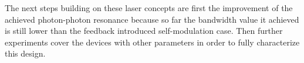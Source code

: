 The next steps building on these laser concepts are first the improvement of the achieved photon-photon resonance because so far the bandwidth value it achieved is still lower than the feedback introduced self-modulation case. Then further experiments cover the devices with other parameters in order to fully characterize this design.


